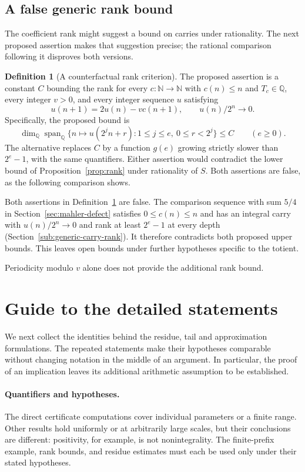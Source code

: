 \documentclass[11pt]{article}
\theoremstyle{plain}
\theoremstyle{definition}
\newtheorem{defn}[thm]{Definition}
\theoremstyle{remark}
\newcommand{\N}{\mathbb{N}}
\newcommand{\Q}{\mathbb{Q}}
\begin{document}
\subsection{A false generic rank bound}

The coefficient rank might suggest a bound on carries under
rationality. The next proposed assertion makes that suggestion precise;
the rational comparison following it disproves both versions.

\begin{defn}[A counterfactual rank criterion]
\label{defn:rankupper}
The proposed assertion is a constant $C$ bounding the rank for every
$c:\N\to\N$ with $c(n)\le n$ and $T_c\in\Q$, every integer $v>0$,
and every integer sequence $u$ satisfying
\[
 u(n+1)=2u(n)-v c(n+1),\qquad u(n)/2^n\longrightarrow0.
\]
Specifically, the proposed bound is
\[
 \dim_{\Q}\operatorname{span}_{\Q}
 \{n\mapsto u(2^jn+r):1\le j\le e,\ 0\le r<2^j\}\le C
 \qquad(e\ge0).
\]
The alternative replaces $C$ by a function $g(e)$ growing strictly slower
than $2^e-1$, with the same quantifiers. Either assertion would contradict
the lower bound of Proposition~\ref{prop:rank} under rationality of $S$.
Both assertions are false, as the following comparison shows.
\end{defn}

Both assertions in Definition~\ref{defn:rankupper} are false.
The comparison sequence with sum $5/4$ in
Section~\ref{sec:mahler-defect} satisfies $0\le c(n)\le n$ and has
an integral carry with $u(n)/2^n\to0$ and rank at least $2^e-1$
at every depth (Section~\ref{sub:generic-carry-rank}). It therefore
contradicts both proposed upper bounds. This leaves open bounds
under further hypotheses specific to the totient.

Periodicity modulo $v$ alone does not provide the additional rank bound.


\section{Guide to the detailed statements}

We next collect the identities behind the residue, tail and
approximation formulations. The repeated statements make their
hypotheses comparable without changing notation in the middle of an
argument. In particular, the proof of an implication leaves its
additional arithmetic assumption to be established.

\paragraph{Quantifiers and hypotheses.} The direct certificate computations cover individual parameters or a
finite range. Other results hold uniformly or at arbitrarily large scales,
but their conclusions are different: positivity, for example, is not
nonintegrality. The finite-prefix example, rank bounds, and residue estimates
must each be used only under their stated hypotheses.
\end{document}
